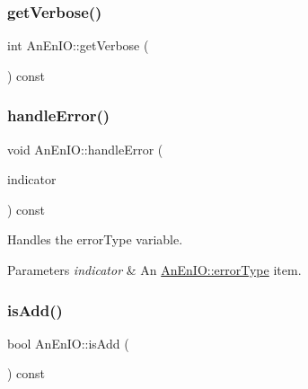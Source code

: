 \subsubsection{\texorpdfstring{get\+Verbose()}{getVerbose()}}
{\footnotesize\ttfamily int An\+En\+I\+O\+::get\+Verbose (\begin{DoxyParamCaption}{ }\end{DoxyParamCaption}) const}

\mbox{\label{class_an_en_i_o_a92276aeba9c0b5bd1cd3d285271d505f}} 
\subsubsection{\texorpdfstring{handle\+Error()}{handleError()}}
{\footnotesize\ttfamily void An\+En\+I\+O\+::handle\+Error (\begin{DoxyParamCaption}\item[{const \mbox{\hyperlink{class_an_en_i_o_aa56bc1ec6610b86db4349bce20f9ead0}{error\+Type}} \&}]{indicator }\end{DoxyParamCaption}) const}

Handles the error\+Type variable.


\begin{DoxyParams}{Parameters}
{\em indicator} & An \mbox{\hyperlink{class_an_en_i_o_aa56bc1ec6610b86db4349bce20f9ead0}{An\+En\+I\+O\+::error\+Type}} item. \\
\hline
\end{DoxyParams}
\mbox{\label{class_an_en_i_o_a0cd2479fe69440fb8643b7b5e84e06b1}} 
\subsubsection{\texorpdfstring{is\+Add()}{isAdd()}}
{\footnotesize\ttfamily bool An\+En\+I\+O\+::is\+Add (\begin{DoxyParamCaption}{ }\end{DoxyParamCaption}) const}

\mbox{\label{class_an_en_i_o_ae8ed483b1dcdbf2a15148d60f8067595}} 

